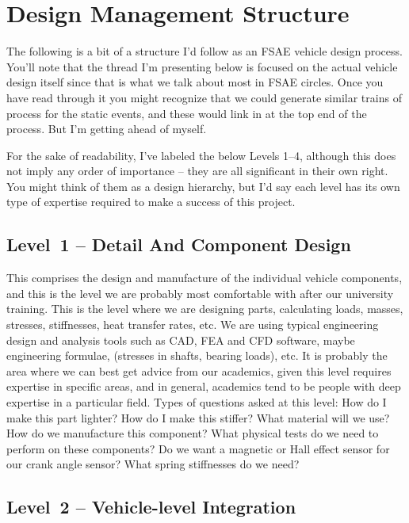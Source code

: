 \documentclass[10pt, a4paper, article, oneside, twocolumn, final]{memoir}
\begin{document}
\section*{Design Management Structure}

The following is a bit of a structure I’d follow as an FSAE vehicle design process. You’ll note that the thread I’m presenting below is focused on the actual vehicle design itself since that is what we talk about most in FSAE circles. Once you have read through it you might recognize that we could generate similar trains of process for the static events, and these would link in at the top end of the process. But I’m getting ahead of myself. 

For the sake of readability, I’ve labeled the below Levels \numrange{1}{4}, although this does not imply any order of importance -- they are all significant in their own right. You might think of them as a design hierarchy, but I’d say each level has its own type of expertise required to make a success of this project. 

\subsection*{Level~1 -- Detail And Component Design}

This comprises the design and manufacture of the individual vehicle components, and this is the level we are probably most comfortable with after our university training. This is the level where we are designing parts, calculating loads, masses, stresses, stiffnesses, heat transfer rates, etc. We are using typical engineering design and analysis tools such as CAD, FEA and CFD software, maybe engineering formulae, (stresses in shafts, bearing loads), etc. It is probably the area where we can best get advice from our academics, given this level requires expertise in specific areas, and in general, academics tend to be people with deep expertise in a particular field. Types of questions asked at this level: How do I make this part lighter? How do I make this stiffer? What material will we use? How do we manufacture this component? What physical tests do we need to perform on these components? Do we want a magnetic or Hall effect sensor for our crank angle sensor? What spring stiffnesses do we need? 

\subsection*{Level~2 -- Vehicle-level Integration }
\end{document}

